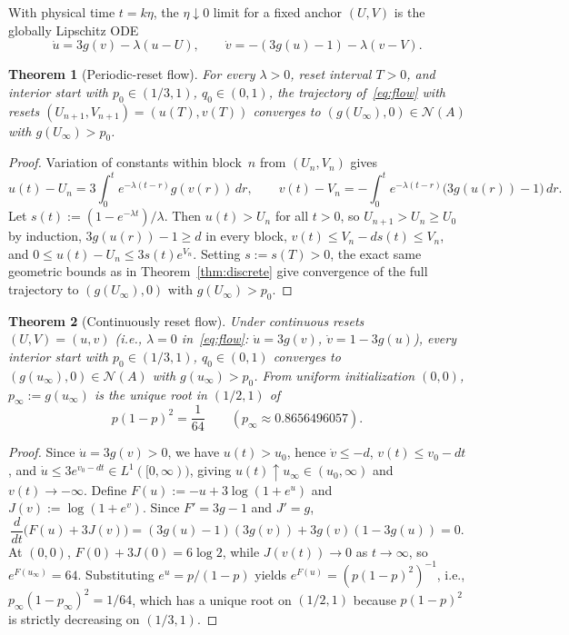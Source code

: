 \documentclass[11pt]{article}
\theoremstyle{plain}
\newtheorem{theorem}{Theorem}
\theoremstyle{definition}
\theoremstyle{remark}
\newcommand{\NE}{\mathcal{N}}
\begin{document}
With physical time $t = k\eta$, the $\eta \downarrow 0$ limit for a fixed anchor $(U, V)$ is the globally Lipschitz ODE
\begin{equation}\label{eq:flow}
\dot u = 3g(v) - \lambda(u - U), \qquad
\dot v = -(3g(u) - 1) - \lambda(v - V).
\end{equation}

\begin{theorem}[Periodic-reset flow]\label{thm:periodic-flow}
For every $\lambda > 0$, reset interval $T > 0$, and interior start with $p_0 \in (1/3, 1)$, $q_0 \in (0, 1)$, the trajectory of~\eqref{eq:flow} with resets $(U_{n+1}, V_{n+1}) = (u(T), v(T))$ converges to $(g(U_\infty), 0) \in \NE(A)$ with $g(U_\infty) > p_0$.
\end{theorem}

\begin{proof}
Variation of constants within block~$n$ from $(U_n, V_n)$ gives
\[
u(t) - U_n = 3\int_0^t e^{-\lambda(t - r)} g(v(r))\,dr, \qquad
v(t) - V_n = -\int_0^t e^{-\lambda(t - r)}\bigl(3g(u(r)) - 1\bigr)\,dr.
\]
Let $s(t) := (1 - e^{-\lambda t})/\lambda$. Then $u(t) > U_n$ for all $t > 0$, so $U_{n+1} > U_n \ge U_0$ by induction, $3g(u(r)) - 1 \ge d$ in every block, $v(t) \le V_n - d s(t) \le V_n$, and $0 \le u(t) - U_n \le 3 s(t) e^{V_n}$. Setting $s := s(T) > 0$, the exact same geometric bounds as in Theorem~\ref{thm:discrete} give convergence of the full trajectory to $(g(U_\infty), 0)$ with $g(U_\infty) > p_0$.
\end{proof}

\begin{theorem}[Continuously reset flow]\label{thm:cont-reset}
Under continuous resets $(U, V) = (u, v)$ (i.e., $\lambda = 0$ in~\eqref{eq:flow}: $\dot u = 3g(v)$, $\dot v = 1 - 3g(u)$), every interior start with $p_0 \in (1/3, 1)$, $q_0 \in (0, 1)$ converges to $(g(u_\infty), 0) \in \NE(A)$ with $g(u_\infty) > p_0$. From uniform initialization $(0, 0)$, $p_\infty := g(u_\infty)$ is the unique root in $(1/2, 1)$ of
\[
p(1 - p)^2 = \frac{1}{64} \qquad (p_\infty \approx 0.8656496057).
\]
\end{theorem}

\begin{proof}
Since $\dot u = 3g(v) > 0$, we have $u(t) > u_0$, hence $\dot v \le -d$, $v(t) \le v_0 - dt$, and $\dot u \le 3e^{v_0 - dt} \in L^1([0, \infty))$, giving $u(t) \uparrow u_\infty \in (u_0, \infty)$ and $v(t) \to -\infty$.
Define $F(u) := -u + 3\log(1 + e^u)$ and $J(v) := \log(1 + e^v)$. Since $F' = 3g - 1$ and $J' = g$,
\[
\frac{d}{dt}\bigl(F(u) + 3J(v)\bigr) = (3g(u) - 1)(3g(v)) + 3g(v)(1 - 3g(u)) = 0.
\]
At $(0, 0)$, $F(0) + 3J(0) = 6\log 2$, while $J(v(t)) \to 0$ as $t \to \infty$, so $e^{F(u_\infty)} = 64$. Substituting $e^u = p/(1 - p)$ yields $e^{F(u)} = (p(1 - p)^2)^{-1}$, i.e., $p_\infty(1 - p_\infty)^2 = 1/64$, which has a unique root on $(1/2, 1)$ because $p(1 - p)^2$ is strictly decreasing on $(1/3, 1)$.
\end{proof}
\end{document}
